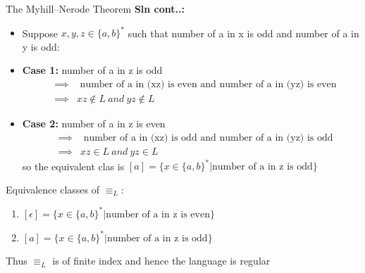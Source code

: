 \documentclass{beamer}
\begin{document}
\begin{frame}{The Myhill–Nerode Theorem}
	\small
	\textbf{Sln cont..:}\\

		\begin{itemize}
			\item Suppose $x,y,z \in \{a,b\}^*$ such that number of a in x is  odd and number of a in y is  odd:
			\item \textbf{Case 1:} number of a in z is odd
			\begin{eqnarray*}
				&\implies &\mbox{ number of a in  (xz) is even and number of a in  (yz) is even}\\
				&\implies & xz \notin L \ and \ yz \notin L
			\end{eqnarray*}
			\item \textbf{Case 2:} number of a in z is even
			\begin{eqnarray*}
				&\implies &\mbox{ number of a in  (xz) is odd and number of a in  (yz) is odd}\\
				&\implies & xz \in L \ and \ yz \in L
			\end{eqnarray*}
			so the equivalent clas is $[a] = \{x \in \{a,b\}^* \big| \mbox{number of a in z is odd}\}$ 
			
		\end{itemize}
Equivalence classes of $\equiv_L:$
\begin{enumerate}
	\item $[\epsilon] = \{x \in \{a,b\}^* \big| \mbox{number of a in z is even}\}$ 
	\item $[a] = \{x \in \{a,b\}^* \big| \mbox{number of a in z is odd}\}$ 
\end{enumerate}
Thus $\equiv_L$ is of finite index and hence the language is regular
\end{frame}	
\end{document}
